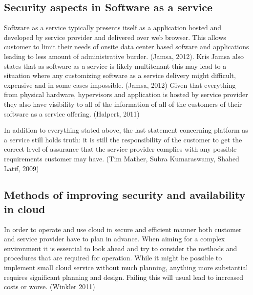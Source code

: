 \documentclass{article}
\begin{document}
\subsection{Security aspects in Software as a service}
Software as a service typically presents itself as a application hosted and developed by service provider and delivered over web browser. This allows customer to limit their needs of onsite data center based sofware and applications leading to less amount of administrative burder. (Jamsa, 2012). Kris Jamsa also states that as software as a service is likely multitenant this may lead to a situation where any customizing software as a service delivery might difficult, expensive and in some cases impossible. (Jamsa, 2012)
Given that everything from physical hardware, hypervisors and application is hosted by service provider they also have visibility to all of the information of all of the customers of their software as a service offering. (Halpert, 2011)
\par
In addition to everything stated above, the last statement concerning platform as a service still holds truth: it is still the responsibility of the customer to get the correct level of assurance that the service provider complies with any possible requirements customer may have. (Tim Mather, Subra Kumaraswamy, Shahed Latif, 2009)
\subsection{Methods of improving security and availability in cloud}
In order to operate and use cloud in secure and efficient manner both customer and service provider have to plan in advance. When aiming for a complex environment it is essential to look ahead and try to consider the methods and procedures that are required for operation. While it might be possible to implement small cloud service without much planning, anything more substantial requires significant planning and design. Failing this will usual lead to increased costs or worse. (Winkler 2011)
\end{document}
